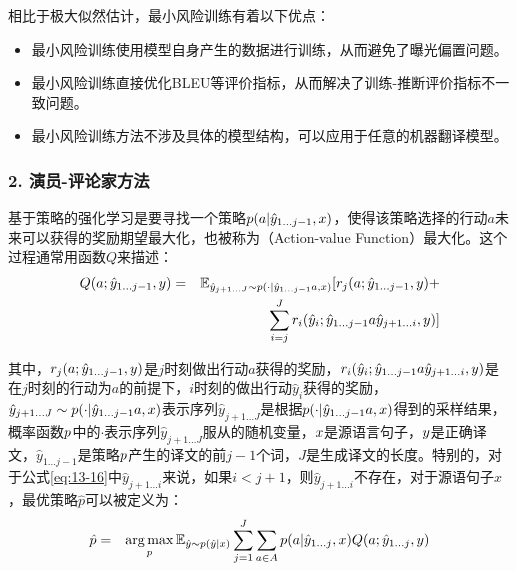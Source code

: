 \parinterval 相比于极大似然估计，最小风险训练有着以下优点：

\begin{itemize}
\vspace{0.5em}
\item 最小风险训练使用模型自身产生的数据进行训练，从而避免了曝光偏置问题。
\vspace{0.5em}
\item 最小风险训练直接优化BLEU等评价指标，从而解决了训练-推断评价指标不一致问题。
\vspace{0.5em}
\item 最小风险训练方法不涉及具体的模型结构，可以应用于任意的机器翻译模型。
\vspace{0.5em}
\end{itemize}


\subsubsection{2. 演员-评论家方法}

\parinterval 基于策略的强化学习是要寻找一个策略${p}(a|\hat{{y}}_{1 \ldots j-1},{x})$，使得该策略选择的行动$a$未来可以获得的奖励期望最大化，也被称为{\small{}}（Action-value Function）最大化。这个过程通常用函数$Q$来描述：
\begin{eqnarray}
{Q}(a;\hat{y}_{1 \ldots j-1},{y}) & = & \mathbb{E}_{\hat{y}_{j+1 \ldots J} \sim {p}(\cdot|\hat{y}_{1 \ldots j-1} a,{x})}[{r}_j(a;\hat{y}_{1 \ldots j-1},{y}) + \nonumber \\
&  & \sum_{i=j}^J{r}_i(\hat{{y}}_i;\hat{{y}}_{1 \ldots j-1}a\hat{{y}}_{j+1 \ldots i},{y})]
\label{eq:13-16}
\end{eqnarray}

\noindent 其中，${r}_j(a;\hat{{y}}_{1 \ldots j-1},{y})$是$j$时刻做出行动$a$获得的奖励，${r}_i(\hat{{y}}_i;\hat{{y}}_{1 \ldots j-1}a\hat{{y}}_{j+1 \ldots i},{y})$是在$j$时刻的行动为$a$的前提下，$i$时刻的做出行动$\hat{{y}}_i$获得的奖励，$\hat{y}_{j+1 \ldots J} \sim {p}(\cdot|\hat{y}_{1 \ldots j-1} a,{x})$表示序列$\hat{y}_{j+1 \ldots J}$是根据${p}(\cdot|\hat{y}_{1 \ldots j-1} a,{x})$得到的采样结果，概率函数${p}$中的$\cdot$表示序列$\hat{y}_{j+1 \ldots J}$服从的随机变量，${x}$是源语言句子，${y}$是正确译文，$\hat{{y}}_{1 \ldots j-1}$是策略${p}$产生的译文的前$j-1$个词，$J$是生成译文的长度。特别的，对于公式\ref{eq:13-16}中$\hat{{y}}_{j+1 \ldots i}$来说，如果$i<j+1$，则$\hat{{y}}_{j+1 \ldots i}$不存在，对于源语句子$x$，最优策略$\hat{p}$可以被定义为：
\begin{eqnarray}
\hat{p} & = & \operatorname*{arg\,max}_{{p}}\mathbb{E}_{\hat{{y}} \sim {p}(\hat{{y}} | {x})}\sum_{j=1}^J\sum_{a \in A}{p}(a|\hat{{y}}_{1 \ldots j},{x}){Q}(a;\hat{{y}}_{1 \ldots j},{y})
\label{eq:13-17}
\end{eqnarray}


